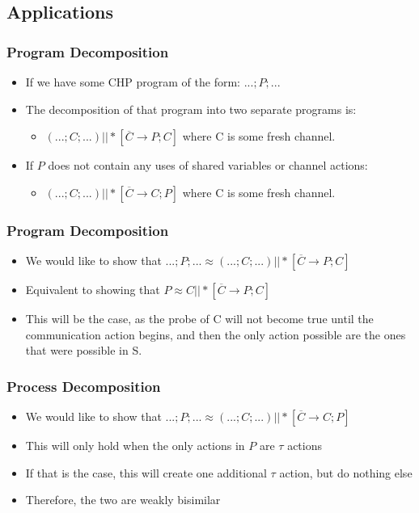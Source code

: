 \documentclass[compress]{beamer}
\begin{document}
\subsection{Applications}
\begin{frame}
\frametitle{Program Decomposition}
\begin{itemize}
\item If we have some CHP program of the form: $...;P;...$
\pause
\item The decomposition of that program into two separate programs is:
\begin{itemize}
\item $(...;C;...) || *[\overline{C} \rightarrow P; C] $ where C is some fresh channel.
\end{itemize}
\pause
\item If $P$ does not contain any uses of shared variables or channel actions:
\begin{itemize}
\item$(...;C;...) || *[\overline{C} \rightarrow C; P] $ where C is some fresh channel.
\end{itemize}
\end{itemize}
\end{frame}
\begin{frame}
\frametitle{Program Decomposition}
\begin{itemize}
\item We would like to show that $ ...;P;... \approx (...;C;...) || *[\overline{C} \rightarrow P; C]$
\pause
\item Equivalent to showing that $P \approx C || *[\overline{C} \rightarrow P; C]$
\pause
\item This will be the case, as the probe of C will not become true until the communication action begins, and then the only action possible are the ones that were possible in S.
\end{itemize}
\end{frame}
\begin{frame}
\frametitle{Process Decomposition}
\begin{itemize}
\item We would like to show that $ ...;P;... \approx (...;C;...) || *[\overline{C} \rightarrow C; P]$
\pause
\item This will only hold when the only actions in $P$ are $\tau$ actions
\pause
\item If that is the case, this will create one additional $\tau$ action, but do nothing else
\pause
\item Therefore, the two are weakly bisimilar
\end{itemize}
\end{frame}
\end{document}

